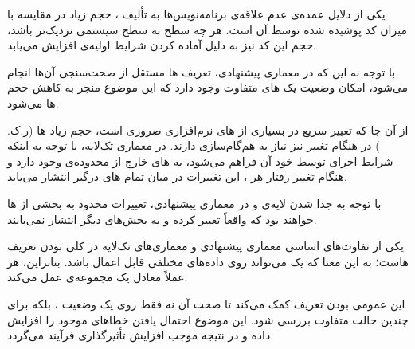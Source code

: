 
یکی از دلایل عمده‌ی عدم علاقه‌ی برنامه‌نویس‌ها به تألیف ، حجم زیاد  در مقایسه با میزان کد پوشیده شده توسط آن است. هر چه سطح  به سطح سیستمی نزدیک‌تر باشد، حجم این کد نیز به دلیل آماده کردن شرایط اولیه‌ی  افزایش می‌یابد.

با توجه به این که در معماری پیشنهادی، تعریف ‌ها مستقل از صحت‌سنجی آن‌ها انجام می‌شود، امکان  وضعیت یک  ‌های متفاوت وجود دارد که این موضوع منجر به کاهش حجم ‌ها می‌شود.

از آن جا که تغییر سریع در بسیاری از ‌های نرم‌افزاری ضروری است، حجم زیاد ‌ها (ر.ک. ) در هنگام تغییر نیز نیاز به هم‌گام‌سازی دارند. در معماری تک‌لایه، با توجه به اینکه شرایط اجرای  توسط خود آن فراهم می‌شود،  به ‌های خارج از محدوده‌ی  وجود دارد و هنگام تغییر رفتار هر ، این تغییرات در میان تمام ‌های درگیر انتشار می‌یابد.

با توجه به جدا شدن لایه‌ی  و  در معماری پیشنهادی، تغییرات محدود به بخشی از ‌ها خواهند بود که واقعاً تغییر کرده و به بخش‌های دیگر انتشار نمی‌یابند.


یکی از تفاوت‌های اساسی معماری پیشنهادی و معماری‌های تک‌لایه در کلی بودن تعریف ‌هاست؛ به این معنا که یک  می‌تواند روی داده‌های مختلفی قابل اعمال باشد. بنابراین، هر  عملاً معادل یک مجموعه‌ی  عمل می‌کند.

این عمومی بودن تعریف  کمک می‌کند تا صحت آن نه فقط روی یک وضعیت ، بلکه برای چندین حالت متفاوت بررسی شود. این موضوع احتمال یافتن خطاهای موجود را افزایش داده و در نتیجه موجب افزایش تأثیرگذاری فرآیند  می‌گردد.
